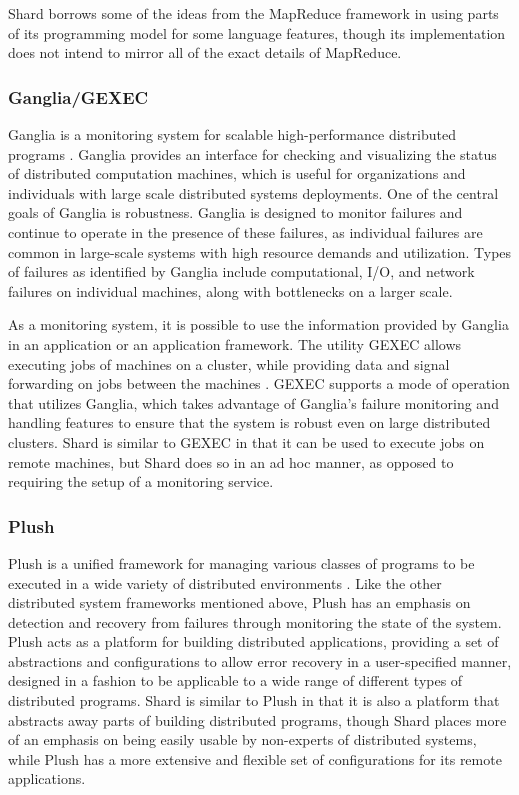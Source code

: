 \documentclass[twoside]{report}
\begin{document}
Shard borrows some of the ideas from the MapReduce framework in using parts of its programming model for some language features, though its implementation does not intend to mirror all of the exact details of MapReduce.

\subsubsection{Ganglia/GEXEC}
Ganglia is a monitoring system for scalable high-performance distributed programs \cite{MASSIE2004817}.
Ganglia provides an interface for checking and visualizing the status of distributed computation machines, which is useful for organizations and individuals with large scale distributed systems deployments.
One of the central goals of Ganglia is robustness.
Ganglia is designed to monitor failures and continue to operate in the presence of these failures, as individual failures are common in large-scale systems with high resource demands and utilization.
Types of failures as identified by Ganglia include computational, I/O, and network failures on individual machines, along with bottlenecks on a larger scale.

As a monitoring system, it is possible to use the information provided by Ganglia in an application or an application framework.
The utility GEXEC allows executing jobs of machines on a cluster, while providing data and signal forwarding on jobs between the machines \cite{gexec}.
GEXEC supports a mode of operation that utilizes Ganglia, which takes advantage of Ganglia's failure monitoring and handling features to ensure that the system is robust even on large distributed clusters.
Shard is similar to GEXEC in that it can be used to execute jobs on remote machines, but Shard does so in an ad hoc manner, as opposed to requiring the setup of a monitoring service.

\subsubsection{Plush}
Plush is a unified framework for managing various classes of programs to be executed in a wide variety of distributed environments \cite{10.5555/1349426.1349441}.
Like the other distributed system frameworks mentioned above, Plush has an emphasis on detection and recovery from failures through monitoring the state of the system.
Plush acts as a platform for building distributed applications, providing a set of abstractions and configurations to allow error recovery in a user-specified manner, designed in a fashion to be applicable to a wide range of different types of distributed programs.
Shard is similar to Plush in that it is also a platform that abstracts away parts of building distributed programs, though Shard places more of an emphasis on being easily usable by non-experts of distributed systems, while Plush has a more extensive and flexible set of configurations for its remote applications.
\end{document}
